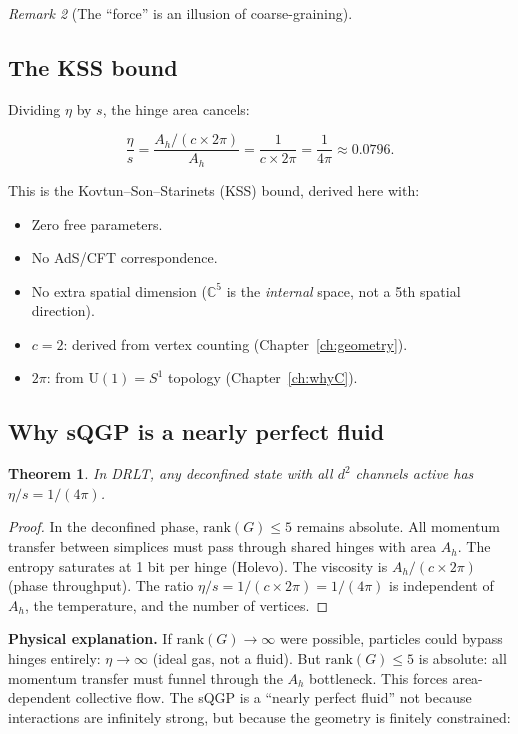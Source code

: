 \documentclass[12pt]{article}
\newtheorem{theorem}{Theorem}[section]
\theoremstyle{remark}
\newtheorem{remark}[theorem]{Remark}
\theoremstyle{definition}
\newcommand{\CC}{\mathbb{C}}
\begin{document}
\begin{remark}[The ``force'' is an illusion of coarse-graining]
\subsection{The KSS bound}

Dividing $\eta$ by $s$, the hinge area cancels:

\begin{equation}
\boxed{\frac{\eta}{s} = \frac{A_h/(c \times 2\pi)}{A_h} = \frac{1}{c \times 2\pi} = \frac{1}{4\pi} \approx 0.0796.}
\end{equation}

This is the Kovtun--Son--Starinets (KSS) bound, derived here with:
\begin{itemize}
\item Zero free parameters.
\item No AdS/CFT correspondence.
\item No extra spatial dimension ($\CC^5$ is the \emph{internal} space, not a 5th spatial direction).
\item $c = 2$: derived from vertex counting (Chapter~\ref{ch:geometry}).
\item $2\pi$: from $\text{U}(1) = S^1$ topology (Chapter~\ref{ch:whyC}).
\end{itemize}

\subsection{Why sQGP is a nearly perfect fluid}

\begin{theorem}
In DRLT, any deconfined state with all $d^2$ channels active has $\eta/s = 1/(4\pi)$.
\end{theorem}

\begin{proof}
In the deconfined phase, $\text{rank}(G) \leq 5$ remains absolute. All momentum transfer between simplices must pass through shared hinges with area $A_h$. The entropy saturates at 1 bit per hinge (Holevo). The viscosity is $A_h/(c \times 2\pi)$ (phase throughput). The ratio $\eta/s = 1/(c \times 2\pi) = 1/(4\pi)$ is independent of $A_h$, the temperature, and the number of vertices.
\end{proof}

\textbf{Physical explanation.} If $\text{rank}(G) \to \infty$ were possible, particles could bypass hinges entirely: $\eta \to \infty$ (ideal gas, not a fluid). But $\text{rank}(G) \leq 5$ is absolute: all momentum transfer must funnel through the $A_h$ bottleneck. This forces area-dependent collective flow. The sQGP is a ``nearly perfect fluid'' not because interactions are infinitely strong, but because the geometry is finitely constrained:


\end{remark}
\end{document}
